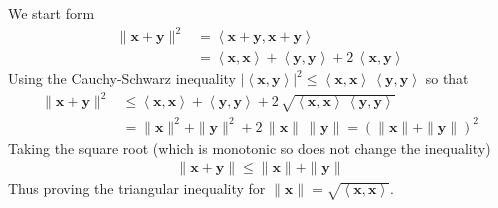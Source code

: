 \documentclass{sotonExamBoxes}    %
\newcommand{\len}[1]{\| #1 \|}
\newcommand{\inner}[2]{\left\langle #1, #2\right\rangle}
\begin{document}
\begin{question}{20}
\begin{qparts}
    \begin{answer}
      We start form
      \begin{align*}
        \len{\bm{x}+\bm{y}}^2
        &=  \inner{\bm{x} + \bm{y}}{\bm{x} + \bm{y}}
        \\
        &=  \inner{\bm{x}}{\bm{x}} + \inner{\bm{y}}{\bm{y}}
          + 2 \, \inner{\bm{x}}{\bm{y}}
      \end{align*}
      Using the Cauchy-Schwarz inequality $|\inner{\bm{x}}{\bm{y}}|^2
      \leq \inner{\bm{x}}{\bm{x}}\, \inner{\bm{y}}{\bm{y}}$ so that
      \begin{align*}
         \len{\bm{x}+\bm{y}}^2
        &\leq  \inner{\bm{x}}{\bm{x}} + \inner{\bm{y}}{\bm{y}}
          + 2 \, \sqrt{\inner{\bm{x}}{\bm{x}}\, \inner{\bm{y}}{\bm{y}}}
        \\
        &= \len{\bm{x}}^2 + \len{\bm{y}}^2 + 2 \,
          \len{\bm{x}}\,\len{\bm{y}}
        = \left( \len{\bm{x}} + \len{\bm{y}}\right)^2
      \end{align*}
      Taking the square root (which is monotonic so does not change
      the inequality)
      \begin{align*}
         \len{\bm{x}+\bm{y}} \leq  \len{\bm{x}} + \len{\bm{y}}
      \end{align*}
      Thus proving the triangular inequality for
      $\len{\bm{x}} = \sqrt{\inner{\bm{x}}{\bm{x}}}$. 
    \end{answer}
  \end{qparts}
\end{question}
\freshpage

\end{document}
